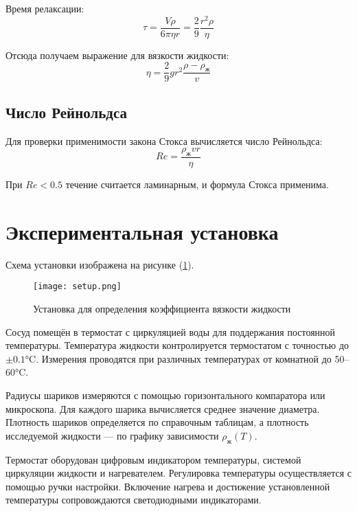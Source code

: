 \documentclass[a4paper,12pt]{article} %
\begin{document}
Время релаксации:
\begin{equation}
	\tau = \frac{V \rho}{6 \pi \eta r} = \frac{2}{9} \frac{r^2 \rho}{\eta}
	\label{tau}
\end{equation}

Отсюда получаем выражение для вязкости жидкости:
\begin{equation}
    \eta = \frac{2}{9} g r^2 \frac{\rho - \rho_\text{ж}}{v}
		\label{eta}
\end{equation}
 
\subsection*{Число Рейнольдса}
Для проверки применимости закона Стокса вычисляется число Рейнольдса:
\begin{equation}
    Re = \frac{\rho_\text{ж} v r}{\eta}
		\label{Re}
\end{equation}

При $Re < 0.5$ течение считается ламинарным, и формула Стокса применима.

\section*{Экспериментальная установка}

Схема установки изображена на рисунке (\ref{fig:setup}). 

\begin{figure}[h!]
	\centering
	\texttt{[image: setup.png]}
	\caption{Установка для определения коэффициента вязкости жидкости}
	\label{fig:setup}
\end{figure}

Сосуд помещён в термостат с циркуляцией воды для поддержания постоянной температуры. Температура жидкости контролируется термостатом с точностью до $\pm 0.1$°C. Измерения проводятся при различных температурах от комнатной до 50–60°C.

Радиусы шариков измеряются с помощью горизонтального компаратора или микроскопа. Для каждого шарика вычисляется среднее значение диаметра. Плотность шариков определяется по справочным таблицам, а плотность исследуемой жидкости — по графику зависимости $\rho_{ж}(T)$.

Термостат оборудован цифровым индикатором температуры, системой циркуляции жидкости и нагревателем. Регулировка температуры осуществляется с помощью ручки настройки. Включение нагрева и достижение установленной температуры сопровождаются светодиодными индикаторами.
\end{document}
